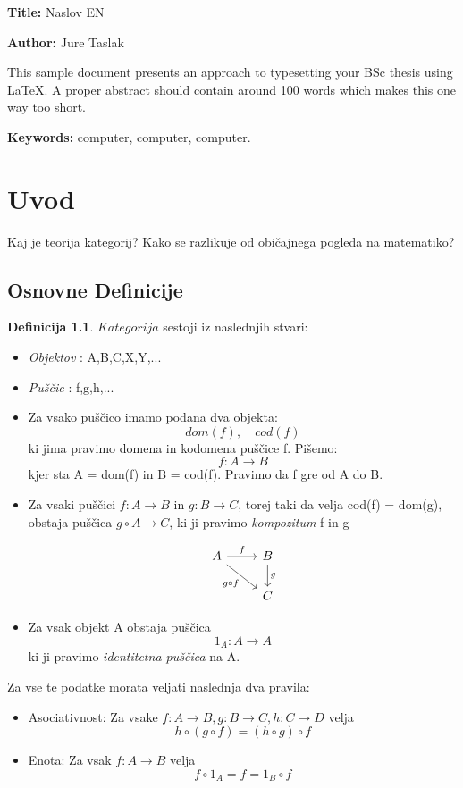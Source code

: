 \documentclass[12pt,a4paper]{book}
\newcommand{\ttitleEn}{Naslov EN}
\newcommand{\tauthor}{Jure Taslak}
\newcommand{\tkeywordsEn}{computer, computer, computer}
\newcommand{\clearemptydoublepage}{\newpage{\pagestyle{empty}\cleardoublepage}}
\theoremstyle{definition}
\newtheorem{definicija}{Definicija}[chapter]
\theoremstyle{plain}
\theoremstyle{definition}
\theoremstyle{remark}
\begin{document}
\noindent\textbf{Title:} \ttitleEn
\bigskip

\noindent\textbf{Author:} \tauthor
\bigskip

\noindent This sample document presents an approach to typesetting your BSc thesis using \LaTeX. 
A proper abstract should contain around 100 words which makes this one way too short.
\bigskip

\noindent\textbf{Keywords:} \tkeywordsEn.
\clearemptydoublepage

\mainmatter
\setcounter{page}{1}
\pagestyle{fancy}

\chapter{Uvod}
Kaj je teorija kategorij? Kako se razlikuje od običajnega pogleda na matematiko?

\section{Osnovne Definicije}

\begin{definicija}
$Kategorija$ sestoji iz naslednjih stvari:
\begin{itemize}
\item \textit{Objektov} : A,B,C,X,Y,...
\item \textit{Puščic} : f,g,h,...
\item Za vsako puščico imamo podana dva objekta: $$dom(f), \quad cod(f)$$
ki jima pravimo domena in kodomena puščice f. Pišemo:
$$f\colon A \to B$$
kjer sta A = dom(f) in B = cod(f).
Pravimo da f gre od A do B.
\item Za vsaki puščici $f \colon A \to B$ in $g \colon B \to C$, torej taki da velja cod(f) = dom(g), obstaja puščica $g\circ A \to C$, ki ji pravimo \textit{kompozitum} f in g

\[
\begin{tikzcd}
A \arrow[r, "f"] \arrow[rd, "g \circ f"']  & B  \arrow[d, "g"] \\
				& C
\end{tikzcd}
\] 

\item Za vsak objekt A obstaja puščica
$$1_A : A \to A$$
ki ji pravimo \textit{identitetna puščica} na A.		
\end{itemize}
Za vse te podatke morata veljati naslednja dva pravila:
\begin{itemize}
\item Asociativnost: Za vsake $f : A \to B, g : B \to C, h : C \to D$ velja
$$h \circ (g \circ f) = (h \circ g) \circ f$$
\item Enota: Za vsak $f : A \to B$ velja
$$f \circ 1_A = f = 1_B \circ f$$
\end{itemize}
\end{definicija}
\end{document}
